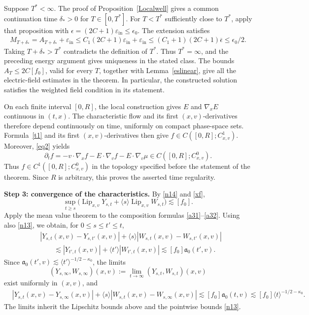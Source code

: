 \documentclass[reqno,11pt]{amsart}
\numberwithin{equation}{section}
\def\bar{\overline}
\def\bar{\overline}
\begin{document}
Suppose $T^*<\infty$. The proof of Proposition~\ref{Localwell}
gives a common continuation time $\delta_*>0$ for $T\in[0,T^*]$.
For $T<T^*$ sufficiently close to $T^*$, apply that proposition
with $\epsilon=(2C+1)\varepsilon_{\mathrm{in}}\leq\epsilon_0$. The extension satisfies
\[
\begin{aligned}
M_{T+\delta_*}
=A_{T+\delta_*}+\varepsilon_{\mathrm{in}}\leq C_1(2C+1)\varepsilon_{\mathrm{in}}+\varepsilon_{\mathrm{in}}\leq(C_1+1)(2C+1)\bar\epsilon
\leq\epsilon_0/2.
\end{aligned}
\]
Taking $T+\delta_*>T^*$ contradicts the definition of $T^*$.
Thus $T^*=\infty$, and the preceding energy
argument gives uniqueness in the stated class.
The bounds $A_T\leq2C[f_0]$, valid for every $T$, together
with Lemma~\ref{eslinear}, give all the electric-field
estimates in the theorem. In particular, the constructed solution satisfies
the weighted field condition in its statement.

On each finite interval $[0,R]$, the local construction gives $E$ and
$\nabla_xE$ continuous in $(t,x)$. The characteristic flow and its first
$(x,v)$-derivatives therefore depend continuously on time, uniformly on
compact phase-space sets. Formula~\eqref{t1} and its first $(x,v)$-derivatives
then give $f\in C([0,R];C^1_{x,v})$. Moreover, \eqref{eq2} yields
\[
\partial_tf=-v\cdot\nabla_xf-E\cdot\nabla_vf-E\cdot\nabla_v\mu
\in C([0,R];C^0_{x,v}).
\]
Thus $f\in C^1([0,R];C^0_{x,v})$ in the topology specified before the
statement of the theorem. Since $R$ is arbitrary, this proves the asserted
time regularity.
\medskip

\textbf{Step 3: convergence of the characteristics.}
By \eqref{n14} and \eqref{xf},
\[
\sup_{t\geq s}
\big(\operatorname{Lip}_{x,v}Y_{s,t}
+\langle s\rangle\operatorname{Lip}_{x,v}W_{s,t}\big)
\lesssim[f_0].
\]
Apply the mean value theorem to the composition formulas
\eqref{a31}--\eqref{a32}. Using also \eqref{n13}, we obtain,
for $0\leq s\leq t'\leq t$,
\[
\begin{split}
&|Y_{s,t}(x,v)-Y_{s,t'}(x,v)|
+\langle s\rangle|W_{s,t}(x,v)-W_{s,t'}(x,v)|\\
&\qquad\lesssim
|Y_{t',t}(x,v)|+\langle t'\rangle|W_{t',t}(x,v)|
\lesssim[f_0]\mathfrak a_0(t',v).
\end{split}
\]
Since $\mathfrak a_0(t',v)\lesssim
\langle t'\rangle^{-1/2-\kappa_0}$, the limits
\[
(Y_{s,\infty},W_{s,\infty})(x,v)
:=\lim_{t\to\infty}(Y_{s,t},W_{s,t})(x,v)
\]
exist uniformly in $(x,v)$, and
\begin{equation}\label{a51}
\begin{split}
&|Y_{s,t}(x,v)-Y_{s,\infty}(x,v)|
+\langle s\rangle|W_{s,t}(x,v)-W_{s,\infty}(x,v)|\lesssim[f_0]\mathfrak a_0(t,v)
\lesssim[f_0]\langle t\rangle^{-1/2-\kappa_0}.
\end{split}
\end{equation}
The limits inherit the Lipschitz bounds above and the
pointwise bounds \eqref{n13}.
\end{document}
